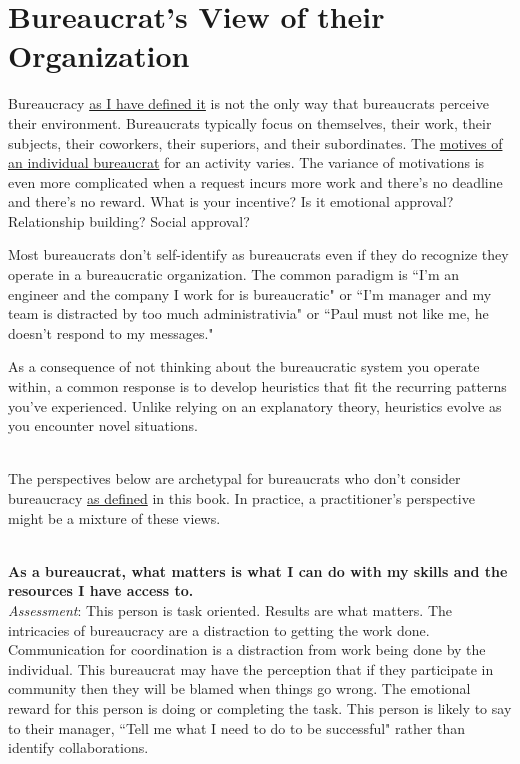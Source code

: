 \section{Bureaucrat's View of their Organization\label{sec:alternative-views-from-within}}

Bureaucracy \hyperref[sec:define-bureaucracy]{as I have defined it} 
is not the only way that bureaucrats perceive their environment. Bureaucrats typically focus on themselves, their work, their subjects, their coworkers, their superiors, and their subordinates. The \hyperref[sec:motivations]{motives of an individual bureaucrat} for an activity varies.
The variance of motivations is even more complicated when a request incurs more work and there's no deadline and there's no reward. What is your incentive? Is it emotional approval? Relationship building? Social approval?

Most bureaucrats don't self-identify as bureaucrats even if they do recognize they operate in a bureaucratic organization. The common paradigm is ``I'm an engineer and the company I work for is bureaucratic" or ``I'm manager and my team is distracted by too much administrativia" or ``Paul must not like me, he doesn't respond to my messages."

As a consequence of not thinking about the bureaucratic system you operate within, a common response is to develop heuristics that fit the recurring patterns you've experienced. Unlike relying on an explanatory theory, heuristics evolve as you encounter novel situations.

\ \\

The perspectives below are archetypal for bureaucrats who don't consider bureaucracy \hyperref[sec:define-bureaucracy]{as defined} in this book.
In practice, a practitioner's perspective might be a mixture of these views.

\ \\
\textbf{As a bureaucrat, what matters is what I can do with my skills and the resources I have access to.} \\
\textit{Assessment}: This person is task oriented. Results are what matters. The intricacies of bureaucracy are a distraction to getting the work done. 
Communication for coordination is a distraction from work being done by the individual. 
This bureaucrat may have the perception that if they participate in community then they will be blamed when things go wrong.
The emotional reward for this person is doing or completing the task. This person is likely to say to their manager, ``Tell me what I need to do to be successful" rather than identify collaborations.

